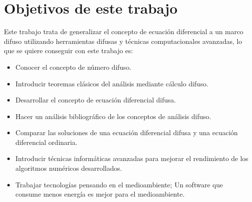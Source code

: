 \section{Objetivos de este trabajo}
Este trabajo trata de generalizar el concepto de ecuación diferencial a un marco difuso utilizando herramientas difusas y técnicas computacionales avanzadas, lo que se quiere conseguir con este trabajo es:
\begin{itemize}
	\item Conocer el concepto de número difuso.
	
	\item Introducir teoremas clásicos del análisis mediante cálculo difuso.
	
	\item Desarrollar el concepto de ecuación diferencial difusa.
	
	\item Hacer un análisis bibliográfico de los conceptos de análisis difuso.
	
	\item Comparar las soluciones de una ecuación diferencial difusa y una ecuación diferencial ordinaria.
	
	\item Introducir técnicas informáticas avanzadas para mejorar el rendimiento de los algoritmos numéricos desarrollados.
	
	\item Trabajar tecnologías pensando en el medioambiente; Un software que consume menos energía es mejor para el medioambiente.
\end{itemize}
